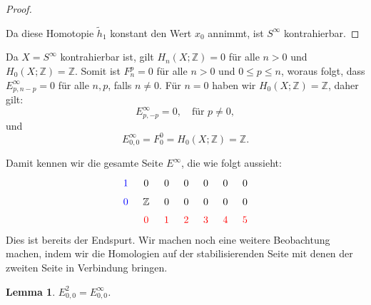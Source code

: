 \documentclass[12pt]{article}
\numberwithin{conj}{section}
\newtheorem{lemma}[conj]{Lemma}
\begin{document}
\begin{proof}
\begin{enumerate}
    \end{enumerate}
    Da diese Homotopie \(\tilde{h}_1\) konstant den Wert \(x_0\) annimmt, ist \(S^\infty\) kontrahierbar.
    \end{proof}

    Da $X = S^{\infty}$ kontrahierbar ist, gilt $H_{n}(X;\mathbb{Z}) = 0$ für alle
    $n > 0$ und $H_{0}(X;\mathbb{Z}) = \mathbb{Z}$. Somit ist $F_{n}^{p} = 0$ für alle
    $n > 0$ und $0 \leq p \leq n$, woraus folgt, dass $E^{\infty}_{p,n-p}= 0$ für alle
    $n,p$, falls $n \neq 0$. Für $n = 0$ haben wir $H_{0}(X;\mathbb{Z}) = \mathbb{Z}$, daher gilt:
    \[
        E^{\infty}_{p,-p}= 0, \quad \text{für }p \neq 0,
    \]
    und
    \[
        E^{\infty}_{0,0}= F_{0}^{0} = H_{0}(X;\mathbb{Z}) = \mathbb{Z}.
    \]

    Damit kennen wir die gesamte Seite $E^{\infty}$, die wie folgt aussieht:
    \[
        \begin{tikzcd}
            [sep=tiny] {\color{blue}1} & 0 & 0 & 0 & 0 & 0 & 0 \\ {\color{blue}0} & {\mathbb{Z}}
            & 0 & 0 & 0 & 0 & 0 \\ & {\color{red}0} & {\color{red}1} & {\color{red}2} &
            {\color{red}3} & {\color{red}4} & {\color{red}5}
        \end{tikzcd}
    \]
    Dies ist bereits der Endspurt. Wir machen noch eine weitere Beobachtung machen, indem
    wir die Homologien auf der stabilisierenden Seite mit denen der zweiten Seite in
    Verbindung bringen.
    \begin{lemma}
        \label{E2}
        $E^{2}_{0,0}= E^{\infty}_{0,0}$.
    \end{lemma}
\end{document}
